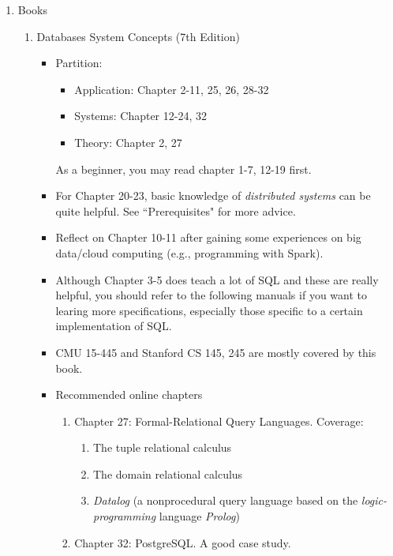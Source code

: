 \documentclass{article}
\begin{document}
\begin{enumerate}
    \item Books
    \begin{enumerate}
    \item Databases System Concepts (7th Edition) \cite{silberschatz2002database}
    \begin{itemize}
        \item Partition:
        \begin{itemize}
            \item Application: Chapter 2-11, 25, 26, 28-32
            \item Systems: Chapter 12-24, 32
            \item Theory: Chapter 2, 27
        \end{itemize}
        As a beginner, you may read chapter 1-7, 12-19 first.        
        \item For Chapter 20-23, basic knowledge of \emph{distributed systems} can be quite helpful.
        See ``Prerequisites" for more advice.
        \item Reflect on Chapter 10-11 after gaining some experiences on big data/cloud computing (e.g., programming with Spark).
        \item Although Chapter 3-5 does teach a lot of SQL and these are really helpful, you should refer to the following manuals if you want to learing more specifications, especially those specific to a certain implementation of SQL.
        \item CMU 15-445 and Stanford CS 145, 245 are mostly covered by this book.
        \item Recommended online chapters
        \begin{enumerate}
            \item Chapter 27: Formal-Relational Query Languages.
            Coverage:
            \begin{enumerate}
                \item The tuple relational calculus
                \item The domain relational calculus
                \item \emph{Datalog} (a nonprocedural query language based on the \emph{logic-programming} language \emph{Prolog})
            \end{enumerate}
            \item Chapter 32: PostgreSQL.
            A good case study.
        \end{enumerate}
    \end{itemize}

\end{enumerate}
\end{enumerate}
\end{document}
